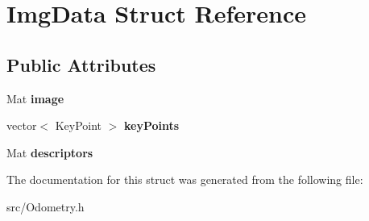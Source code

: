 \hypertarget{struct_img_data}{}\section{Img\+Data Struct Reference}
\label{struct_img_data}
\subsection*{Public Attributes}
\begin{DoxyCompactItemize}
\item 
Mat {\bfseries image}\hypertarget{struct_img_data_a14f0d02c86841af64eeff29ddf0391aa}{}\label{struct_img_data_a14f0d02c86841af64eeff29ddf0391aa}

\item 
vector$<$ Key\+Point $>$ {\bfseries key\+Points}\hypertarget{struct_img_data_a847b3a3f5b13f29daeebc42ebb81b524}{}\label{struct_img_data_a847b3a3f5b13f29daeebc42ebb81b524}

\item 
Mat {\bfseries descriptors}\hypertarget{struct_img_data_a621e0f62a5eeb75cd4311d4e813a7020}{}\label{struct_img_data_a621e0f62a5eeb75cd4311d4e813a7020}

\end{DoxyCompactItemize}


The documentation for this struct was generated from the following file\+:\begin{DoxyCompactItemize}
\item 
src/Odometry.\+h\end{DoxyCompactItemize}
